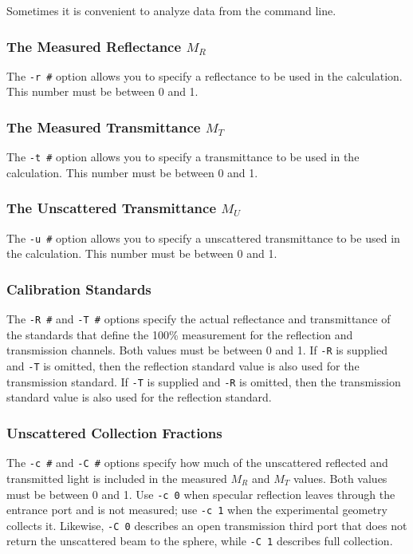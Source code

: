 \documentclass{article}
\begin{document}
Sometimes it is convenient to analyze data from the command line.

\subsubsection{The Measured Reflectance $M_R$}
The \texttt{-r \#} option allows you to specify a reflectance to be
used in the calculation.  This number must be between 0 and 1.

\subsubsection{The Measured Transmittance $M_T$}
The \texttt{-t \#} option allows you to specify a transmittance to be
used in the calculation.  This number must be between 0 and 1.

\subsubsection{The Unscattered Transmittance $M_U$}
The \texttt{-u \#} option allows you to specify a unscattered transmittance to be
used in the calculation.  This number must be between 0 and 1.

\subsubsection{Calibration Standards}
The \texttt{-R \#} and \texttt{-T \#} options specify the actual reflectance
and transmittance of the standards that define the 100\% measurement for the
reflection and transmission channels.  Both values must be between 0 and 1.
If \texttt{-R} is supplied and \texttt{-T} is omitted, then the reflection
standard value is also used for the transmission standard.  If \texttt{-T} is
supplied and \texttt{-R} is omitted, then the transmission standard value is
also used for the reflection standard.

\subsubsection{Unscattered Collection Fractions}
The \texttt{-c \#} and \texttt{-C \#} options specify how much of the
unscattered reflected and transmitted light is included in the measured
$M_R$ and $M_T$ values.  Both values must be between 0 and 1.  Use
\texttt{-c 0} when specular reflection leaves through the entrance port and is
not measured; use \texttt{-c 1} when the experimental geometry collects it.
Likewise, \texttt{-C 0} describes an open transmission third port that does not
return the unscattered beam to the sphere, while \texttt{-C 1} describes full
collection.
\end{document}
